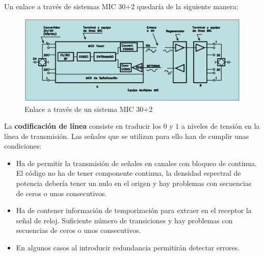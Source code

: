 \documentclass[10pt,portrait, twocolumn]{article}
\makeatletter
\renewcommand{\subsubsection}{\@startsection{subsubsection}{3}{0mm}%
                                {-1ex plus -.5ex minus -.2ex}%
                                {1ex plus .2ex}%
                                {\normalfont\small\bfseries}}
\makeatother
\begin{document}
Un enlace a través de sistemas MIC 30+2 quedaría de la siguiente manera:

	
	\begin{figure}[!ht]
 		\centering
  		 \includegraphics[scale = 0.4]{images/EnlaceMIC}
		\caption{Enlace a través de un sistema MIC 30+2}
	\end{figure}
	

La \textbf{codificación de línea} consiste en traducir los $0$ y $1$ a niveles de tensión en la línea de transmisión. Las señales que se utilizan para ello han de cumplir unas condiciones:

	\begin{itemize}
		\item Ha de permitir la transmisión de señales en canales con bloqueo de continua. El código no ha de tener componente continua, la densidad espectral de potencia debería tener un nulo en el origen y hay problemas con secuencias de ceros o unos consecutivos.
		\item Ha de contener información de temporización para extraer en el receptor la señal de reloj. Suficiente número de transiciones y hay problemas con secuencias de ceros o unos consecutivos.
		\item En algunos casos al introducir redundancia permitirán detectar errores.
	\end{itemize}
	
\end{document}

